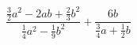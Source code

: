 \begin{ex}[type=expression]
	\begin{condition}
		\( \dfrac{\frac{3}{2}a^2-2ab+\frac{2}{3}b^2}{\frac{1}{4}a^2-\frac{1}{9}b^2}+\dfrac{6b}{\frac{3}{4}a+\frac{1}{2}b} \)
	\end{condition}
\end{ex}